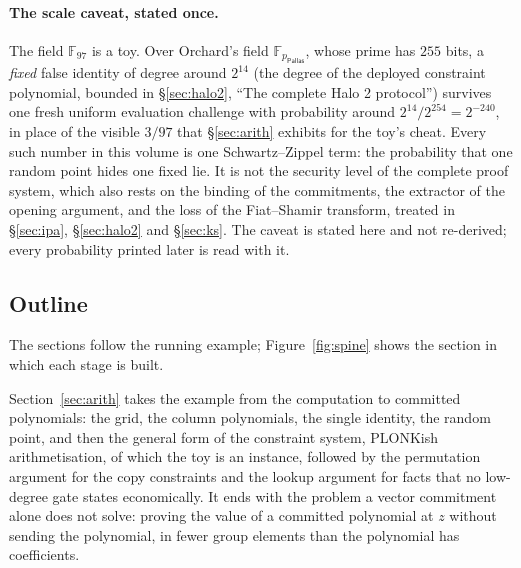 \documentclass[11pt,a4paper]{article}
\theoremstyle{definition}
\newcommand{\F}{\mathbb{F}}
\newcommand{\Pallas}{\ensuremath{\mathsf{Pallas}}}
\begin{document}
\paragraph{The scale caveat, stated once.} The field $\F_{97}$ is a
toy. Over Orchard's field $\F_{p_{\Pallas}}$, whose prime has $255$
bits, a \emph{fixed} false identity of degree around $2^{14}$ (the
degree of the deployed constraint polynomial, bounded in
\S\ref{sec:halo2}, ``The complete Halo 2 protocol'') survives one fresh
uniform evaluation challenge with probability around
$2^{14}/2^{254} = 2^{-240}$, in place of the visible $3/97$ that
\S\ref{sec:arith} exhibits for the toy's cheat. Every such number in
this volume is one Schwartz--Zippel term: the probability that one
random point hides one fixed lie. It is not the security level of the
complete proof system, which also rests on the binding of the
commitments, the extractor of the opening argument, and the loss of the
Fiat--Shamir transform, treated in \S\ref{sec:ipa}, \S\ref{sec:halo2}
and \S\ref{sec:ks}. The caveat is stated here and not re-derived; every
probability printed later is read with it.

\subsection{Outline}\label{sec:intro-road}

The sections follow the running example; Figure~\ref{fig:spine} shows
the section in which each stage is built.

Section~\ref{sec:arith} takes the example from the computation to committed
polynomials: the grid, the column polynomials, the single identity, the random
point, and then the general form of the constraint system, PLONKish
arithmetisation, of which the toy is an instance, followed by the permutation
argument for the copy constraints and the lookup argument for facts that no
low-degree gate states economically. It ends with the problem a vector
commitment alone does not solve: proving the value of a committed polynomial at
$z$ without sending the polynomial, in fewer group elements than the polynomial
has coefficients.
\end{document}
